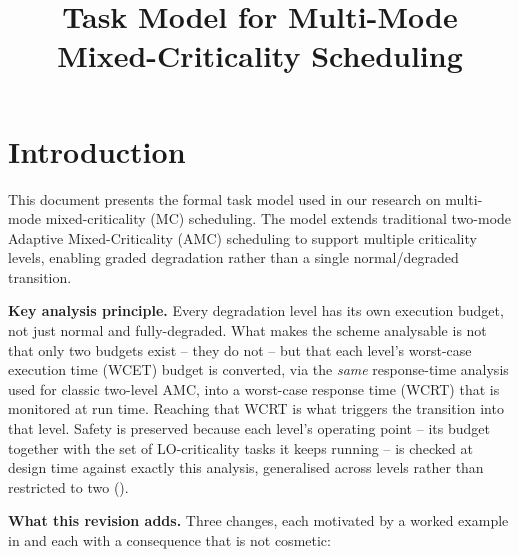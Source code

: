 \documentclass{article}
\title{Task Model for Multi-Mode Mixed-Criticality Scheduling}
\author{}
\date{}
\begin{document}
\maketitle

\section{Introduction}

This document presents the formal task model used in our research on multi-mode
mixed-criticality (MC) scheduling. The model extends traditional two-mode
Adaptive Mixed-Criticality (AMC) scheduling to support multiple criticality
levels, enabling graded degradation rather than a single normal/degraded
transition.

\textbf{Key analysis principle.} Every degradation level has its own execution
budget, not just normal and fully-degraded. What makes the scheme analysable is
not that only two budgets exist -- they do not -- but that each level's
worst-case execution time (WCET) budget is converted, via the \emph{same}
response-time analysis used for classic two-level AMC, into a worst-case
response time (WCRT) that is monitored at run time. Reaching that WCRT is what
triggers the transition into that level. Safety is preserved because each
level's operating point -- its budget together with the set of LO-criticality
tasks it keeps running -- is checked at design time against exactly this
analysis, generalised across levels rather than restricted to two
().

\textbf{What this revision adds.} Three changes, each motivated by a worked
example in  and each with a consequence that is not
cosmetic:
\end{document}

